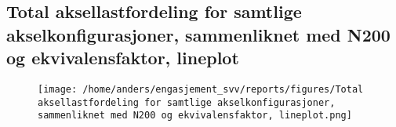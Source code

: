 \documentclass{article}
\begin{document}
\subsection{Total aksellastfordeling for samtlige akselkonfigurasjoner, sammenliknet med N200 og ekvivalensfaktor, lineplot}
\begin{figure}[H]
\centering
\texttt{[image: /home/anders/engasjement\_svv/reports/figures/Total aksellastfordeling for samtlige akselkonfigurasjoner, sammenliknet med N200 og ekvivalensfaktor, lineplot.png]}
\end{figure}
\end{document}
